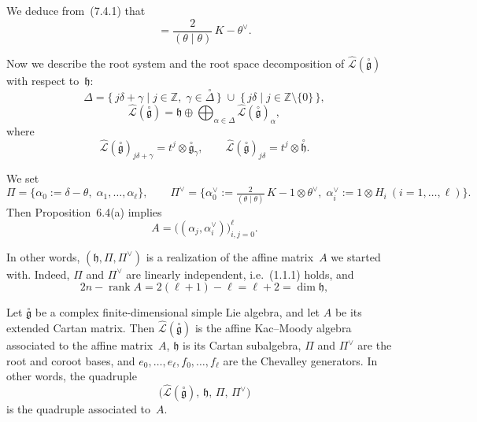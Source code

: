 \documentclass[12pt]{article}
\begin{document}
We deduce from~(7.4.1) that
\begin{equation}
[E_0, F_0] = \frac{2}{(\theta\mid\theta)}\,K - \theta^\vee.
\tag{7.4.2}
\end{equation}

Now we describe the root system and the root space decomposition of 
$\widehat{\mathcal{L}}(\overset{\circ}{\mathfrak{g}})$ with respect to~$\mathfrak{h}$:
\[
\Delta = \{\, j\delta + \gamma \mid j \in \mathbb{Z},\; \gamma \in \overset{\circ}{\Delta}\,\}
       \;\cup\;
       \{\, j\delta \mid j \in \mathbb{Z}\setminus\{0\}\,\},
\]
\[
\widehat{\mathcal{L}}(\overset{\circ}{\mathfrak{g}})
= \mathfrak{h} \oplus
  \bigoplus_{\alpha \in \Delta}
  \widehat{\mathcal{L}}(\overset{\circ}{\mathfrak{g}})_\alpha,
\]
where
\[
\widehat{\mathcal{L}}(\overset{\circ}{\mathfrak{g}})_{j\delta+\gamma}
= t^j \otimes \overset{\circ}{\mathfrak{g}}_\gamma,
\qquad
\widehat{\mathcal{L}}(\overset{\circ}{\mathfrak{g}})_{j\delta}
= t^j \otimes \overset{\circ}{\mathfrak{h}}.
\]

We set
\[
\Pi = \{\alpha_0 := \delta - \theta,\; \alpha_1,\dots,\alpha_\ell\},
\qquad
\Pi^\vee = \{\alpha_0^\vee := \tfrac{2}{(\theta\mid\theta)}\,K - 1\otimes\theta^\vee,\;
             \alpha_i^\vee := 1\otimes H_i \ (i=1,\dots,\ell)\}.
\]
Then Proposition~6.4(a) implies
\begin{equation}
A = \big((\alpha_j,\alpha_i^\vee)\big)_{i,j=0}^\ell.
\tag{7.4.3}
\end{equation}

In other words, $(\mathfrak{h}, \Pi, \Pi^\vee)$ is a realization of the affine matrix~$A$ we started with.  
Indeed, $\Pi$ and $\Pi^\vee$ are linearly independent, i.e.~(1.1.1) holds, and
\[
2n - \operatorname{rank}A = 2(\ell + 1) - \ell = \ell + 2 = \dim \mathfrak{h},
\]

\begin{theorem}[7.4]
Let $\overset{\circ}{\mathfrak{g}}$ be a complex finite-dimensional simple Lie algebra, 
and let $A$ be its extended Cartan matrix.  
Then $\widehat{\mathcal{L}}(\overset{\circ}{\mathfrak{g}})$ is the affine Kac–Moody algebra
associated to the affine matrix~$A$, $\mathfrak{h}$ is its Cartan subalgebra,
$\Pi$ and $\Pi^\vee$ are the root and coroot bases, and
$e_0,\dots,e_\ell, f_0,\dots,f_\ell$ are the Chevalley generators.  
In other words, the quadruple
\[
\big(\widehat{\mathcal{L}}(\overset{\circ}{\mathfrak{g}}),\, 
\mathfrak{h},\, \Pi,\, \Pi^\vee\big)
\]
is the quadruple associated to~$A$.
\end{theorem}
\end{document}
